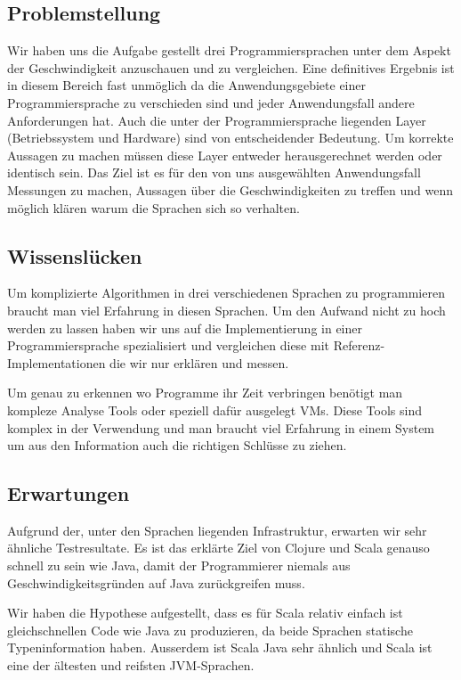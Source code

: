 \documentclass{fancydocument}
\begin{document}
\subsection{Problemstellung}

Wir haben uns die Aufgabe gestellt drei Programmiersprachen unter dem
Aspekt der Geschwindigkeit anzuschauen und zu vergleichen. Eine
definitives Ergebnis ist in diesem Bereich fast unmöglich da die
Anwendungsgebiete einer Programmiersprache zu verschieden sind und
jeder Anwendungsfall andere Anforderungen hat. Auch die
unter der Programmiersprache liegenden Layer (Betriebssystem und
Hardware) sind von entscheidender Bedeutung. Um korrekte Aussagen zu
machen m\"ussen diese Layer entweder herausgerechnet werden oder
identisch sein. Das Ziel ist es f\"ur den von uns ausgew\"ahlten Anwendungsfall Messungen
zu machen, Aussagen \"uber die Geschwindigkeiten zu treffen und
wenn m\"oglich kl\"aren warum die Sprachen sich so verhalten.

\subsection{Wissenslücken}

Um komplizierte Algorithmen in drei verschiedenen Sprachen zu
programmieren braucht man viel Erfahrung in diesen Sprachen. Um den
Aufwand nicht zu hoch werden zu lassen haben wir uns auf die
Implementierung in einer Programmiersprache spezialisiert und
vergleichen diese mit Referenz-Implementationen die wir nur erklären
und messen.

Um genau zu erkennen wo Programme ihr Zeit verbringen benötigt man
kompleze Analyse Tools oder speziell dafür ausgelegt VMs. Diese Tools
sind komplex in der Verwendung und man braucht viel Erfahrung in einem
System um aus den Information auch die richtigen Schlüsse zu ziehen.

\subsection{Erwartungen}

Aufgrund der, unter den Sprachen liegenden Infrastruktur, erwarten wir sehr
\"ahnliche Testresultate. Es ist das erkl\"arte Ziel von Clojure und
Scala genauso schnell zu sein wie Java, damit der Programmierer niemals aus Geschwindigkeitsgründen auf Java zurückgreifen muss.

Wir haben die Hypothese aufgestellt, dass es für Scala relativ einfach ist
gleichschnellen Code wie Java zu produzieren, da beide Sprachen 
statische Typeninformation haben. Ausserdem ist Scala Java sehr ähnlich
und Scala ist eine der \"altesten und reifsten JVM-Sprachen.
\end{document}
